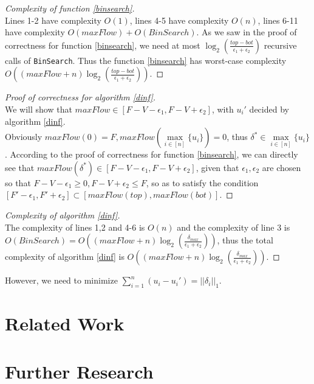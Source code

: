 \documentclass[11pt]{article}
\theoremstyle{definition}
\theoremstyle{corollary}
\theoremstyle{lemma}
\begin{document}
    \begin{proof}[Complexity of function \ref{binsearch}] \ \\
       Lines 1-2 have complexity $O(1)$, lines 4-5 have complexity $O(n)$, lines 6-11 have complexity
       $O(maxFlow) + O(BinSearch)$. As we saw in the proof of correctness for function \ref{binsearch}, we need at most
       $\log_2(\frac{top - bot}{\epsilon_1 + \epsilon_2})$ recursive calls of \texttt{BinSearch}. Thus the function
       \ref{binsearch} has worst-case complexity $O((maxFlow + n)\log_2(\frac{top - bot}{\epsilon_1 + \epsilon_2}))$.
    \end{proof}
    \begin{proof}[Proof of correctness for algorithm \ref{dinf}] \ \\
       We will show that $maxFlow \in [F - V - \epsilon_1, F - V + \epsilon_2]$, with $u_i'$ decided by algorithm
       \ref{dinf}. \\
       Obviously $maxFlow(0) = F, maxFlow(\max\limits_{i \in [n]}\{u_i\}) = 0$, thus $\delta^* \in
       \max\limits_{i \in [n]}\{u_i\}$. According to the proof of correctness for function \ref{binsearch},
       we can directly see that $maxFlow(\delta^*) \in [F - V - \epsilon_1, F - V + \epsilon_2]$, given that
       $\epsilon_1, \epsilon_2$ are chosen so that $F - V - \epsilon_1 \geq 0, F - V + \epsilon_2 \leq F$, so as to satisfy
       the condition $[F' - \epsilon_1, F' + \epsilon_2] \subset [maxFlow(top),maxFlow(bot)]$.
    \end{proof}
    \begin{proof}[Complexity of algorithm \ref{dinf}] \ \\
       The complexity of lines 1,2 and 4-6 is $O(n)$ and the complexity of line 3 is $O(BinSearch) = O((maxFlow + n)
       \log_2(\frac{\delta_{max}}{\epsilon_1 + \epsilon_2}))$, thus the total complexity of algorithm \ref{dinf} is
       $O((maxFlow + n)\log_2(\frac{\delta_{max}}{\epsilon_1 + \epsilon_2}))$.
    \end{proof}

    However, we need to minimize $\sum\limits_{i=1}^{n}(u_i-u_i') = ||\delta_i||_1$.

  \section{Related Work}

  \section{Further Research}
\end{document}
